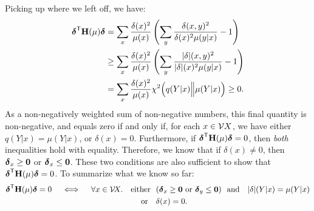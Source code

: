 \begin{lproof}
    Picking up where we left off, we have:
    \begin{align*}
        {\boldsymbol\delta}^{\sf T} \mathbf{H}(\mu) {\boldsymbol\delta} 
            &= \sum_{x} \frac{\delta(x)^2}{\mu(x)} \left( \sum_y \frac{\delta(x,y)^2}{\delta(x)^2 \mu(y|x)} - 1 \right) \\
            &\ge \sum_{x} \frac{\delta(x)^2}{\mu(x)} \left( \sum_y \frac{|\delta|(x,y)^2}{|\delta|(x)^2 \mu(y|x)} - 1 \right) \\
            &=
            \sum_{x} \frac{\delta(x)^2}{\mu(x)} 
            \chi^2 \Big( q(Y|x) \Big\Vert  \mu(Y|x) \Big) \ge 0.
    \end{align*}
    As a non-negatively weighted sum of non-negative numbers, this final quantity is non-negative, and equals zero if and only if, for each $x \in \mathcal V X$, we have either $q(Y|x) = \mu(Y|x)$, or $\delta(x) = 0$. 
    Furthermore, if ${\boldsymbol\delta}^{\sf T} \mathbf{H}(\mu) {\boldsymbol\delta} = 0$, then \emph{both} inequalities hold with equality. Therefore, we know that if $\delta(x) \ne 0$, then ${\boldsymbol\delta}_x \ge \mathbf{0}$ or ${\boldsymbol\delta}_x \le \mathbf{0}$. 
    These two conditions are also sufficient to show that ${\boldsymbol\delta}^{\sf T} \mathbf{H}(\mu) {\boldsymbol\delta} = 0$.
    To summarize what we know so far: 
    \begin{align*}
        {\boldsymbol\delta}^{\sf T} \mathbf{H}(\mu) {\boldsymbol\delta} = 0
            \quad\iff\quad\forall x \in \mathcal V\!X.\quad
                \text{either}&~~  ({\boldsymbol\delta}_x \ge \mathbf{0} \text{ or } {\boldsymbol\delta}_y \le \mathbf{0}) \text{~~and~~ $|\delta|(Y|x) = \mu(Y|x) $}\\
                \text{or }&~~ \delta(x) = 0.
    \end{align*}
    

\end{lproof}
